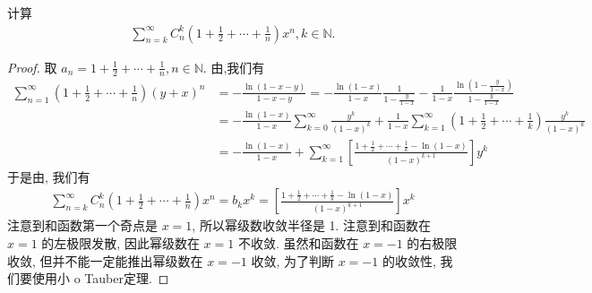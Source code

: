 \documentclass[../../main.tex]{subfiles}%
\begin{document}
\begin{example}
计算
\begin{align*}
\sum_{n=k}^{\infty} C_n^k \left(1 + \frac{1}{2} + \cdots + \frac{1}{n}\right) x^n, k \in \mathbb{N}. 
\end{align*}
\end{example}
\begin{proof}
取 $a_n = 1 + \frac{1}{2} + \cdots + \frac{1}{n}, n \in \mathbb{N}$. 由,我们有
\begin{align*}
\sum_{n=1}^{\infty} \left(1 + \frac{1}{2} + \cdots + \frac{1}{n}\right) (y + x)^n &= -\frac{\ln(1 - x - y)}{1 - x - y} = -\frac{\ln(1 - x)}{1 - x} \frac{1}{1 - \frac{y}{1 - x}} - \frac{1}{1 - x} \frac{\ln\left(1 - \frac{y}{1 - x}\right)}{1 - \frac{y}{1 - x}} \\
&= -\frac{\ln(1 - x)}{1 - x} \sum_{k=0}^{\infty} \frac{y^k}{(1 - x)^k} + \frac{1}{1 - x} \sum_{k=1}^{\infty} \left(1 + \frac{1}{2} + \cdots + \frac{1}{k}\right) \frac{y^k}{(1 - x)^k} \\
&= -\frac{\ln(1 - x)}{1 - x} + \sum_{k=1}^{\infty} \left[\frac{1 + \frac{1}{2} + \cdots + \frac{1}{k} - \ln(1 - x)}{(1 - x)^{k + 1}}\right] y^k
\end{align*}
于是由, 我们有
\begin{align*}
\sum_{n=k}^{\infty} C_n^k \left(1 + \frac{1}{2} + \cdots + \frac{1}{n}\right) x^n = b_k x^k = \left[\frac{1 + \frac{1}{2} + \cdots + \frac{1}{k} - \ln(1 - x)}{(1 - x)^{k + 1}}\right] x^k 
\end{align*}
注意到和函数第一个奇点是 $x = 1$, 所以幂级数收敛半径是 1. 注意到和函数在 $x = 1$ 的左极限发散, 因此幂级数在 $x = 1$ 不收敛. 虽然和函数在 $x = -1$ 的右极限收敛, 但并不能一定能推出幂级数在 $x = -1$ 收敛, 为了判断 $x = -1$ 的收敛性, 我们要使用小 o Tauber定理.


\end{proof}
\end{document}
